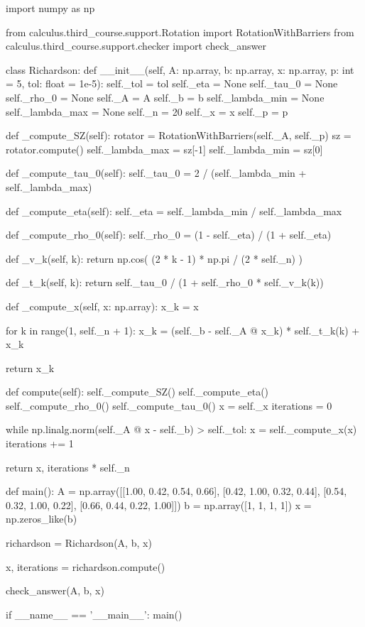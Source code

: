 import numpy as np

from calculus.third_course.support.Rotation import RotationWithBarriers
from calculus.third_course.support.checker import check_answer


class Richardson:
	def __init__(self, A: np.array, b: np.array, x: np.array, p: int = 5, tol: float = 1e-5):
		self._tol = tol
		self._eta = None
		self._tau_0 = None
		self._rho_0 = None
		self._A = A
		self._b = b
		self._lambda_min = None
		self._lambda_max = None
		self._n = 20
		self._x = x
		self._p = p
	
	def _compute_SZ(self):
		rotator = RotationWithBarriers(self._A, self._p)
		sz = rotator.compute()
		self._lambda_max = sz[-1]
		self._lambda_min = sz[0]
	
	def _compute_tau_0(self):
		self._tau_0 = 2 / (self._lambda_min + self._lambda_max)
	
	def _compute_eta(self):
		self._eta = self._lambda_min / self._lambda_max
	
	def _compute_rho_0(self):
		self._rho_0 = (1 - self._eta) / (1 + self._eta)
	
	def _v_k(self, k):
		return np.cos(
		(2 * k - 1) * np.pi /
		(2 * self._n)
		)
	
	def _t_k(self, k):
		return self._tau_0 / (1 + self._rho_0 * self._v_k(k))
	
	def _compute_x(self, x: np.array):
		x_k = x
		
		for k in range(1, self._n + 1):
			x_k = (self._b - self._A @ x_k) * self._t_k(k) + x_k
		
		return x_k
	
	def compute(self):
		self._compute_SZ()
		self._compute_eta()
		self._compute_rho_0()
		self._compute_tau_0()
		x = self._x
		iterations = 0
		
		while np.linalg.norm(self._A @ x - self._b) > self._tol:
			x = self._compute_x(x)
			iterations += 1
		
		return x, iterations * self._n


def main():
	A = np.array([[1.00, 0.42, 0.54, 0.66],
		[0.42, 1.00, 0.32, 0.44],
		[0.54, 0.32, 1.00, 0.22],
		[0.66, 0.44, 0.22, 1.00]])
	b = np.array([1, 1, 1, 1])
	x = np.zeros_like(b)
	
	richardson = Richardson(A, b, x)
	
	x, iterations = richardson.compute()

	check_answer(A, b, x)



if __name__ == '__main__':
	main()